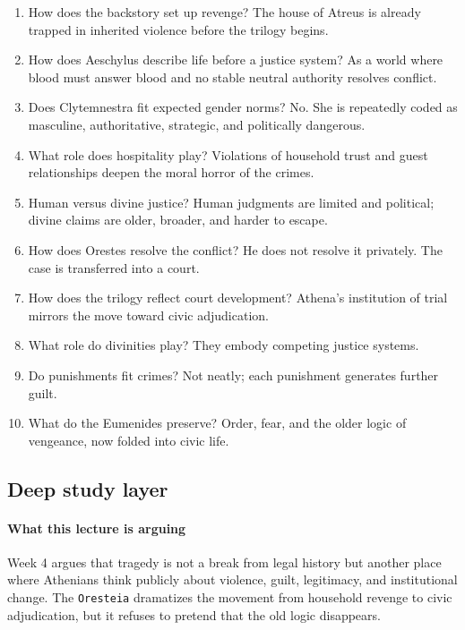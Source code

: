 \documentclass[11pt]{article}
\begin{document}
\begin{enumerate}
\item How does the backstory set up revenge? The house of Atreus is already trapped in inherited violence before the trilogy begins.
\item How does Aeschylus describe life before a justice system? As a world where blood must answer blood and no stable neutral authority resolves conflict.
\item Does Clytemnestra fit expected gender norms? No. She is repeatedly coded as masculine, authoritative, strategic, and politically dangerous.
\item What role does hospitality play? Violations of household trust and guest relationships deepen the moral horror of the crimes.
\item Human versus divine justice? Human judgments are limited and political; divine claims are older, broader, and harder to escape.
\item How does Orestes resolve the conflict? He does not resolve it privately. The case is transferred into a court.
\item How does the trilogy reflect court development? Athena's institution of trial mirrors the move toward civic adjudication.
\item What role do divinities play? They embody competing justice systems.
\item Do punishments fit crimes? Not neatly; each punishment generates further guilt.
\item What do the Eumenides preserve? Order, fear, and the older logic of vengeance, now folded into civic life.
\end{enumerate}

\subsection{Deep study layer}

\paragraph{What this lecture is arguing}

Week 4 argues that tragedy is not a break from legal history but another place where Athenians think publicly about violence, guilt, legitimacy, and institutional change. The \texttt{Oresteia} dramatizes the movement from household revenge to civic adjudication, but it refuses to pretend that the old logic disappears.
\end{document}

